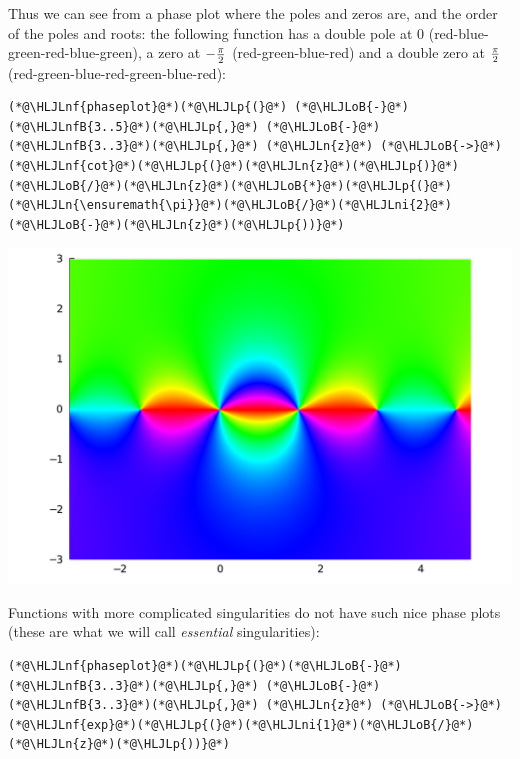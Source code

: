 \documentclass[12pt,a4paper]{article}
\newcommand{\HLJLn}[1]{#1}
\newcommand{\HLJLnf}[1]{\textcolor[RGB]{66,102,213}{#1}}
\newcommand{\HLJLnfB}[1]{\textcolor[RGB]{59,151,46}{#1}}
\newcommand{\HLJLni}[1]{\textcolor[RGB]{59,151,46}{#1}}
\newcommand{\HLJLoB}[1]{\textcolor[RGB]{102,102,102}{\textbf{#1}}}
\newcommand{\HLJLp}[1]{#1}
\begin{document}
Thus we can see from a phase plot where the poles and zeros are, and the order of the poles and roots: the following function has a double pole at 0 (red-blue-green-red-blue-green), a zero at $-{\pi \over 2}$ (red-green-blue-red) and a double zero at $\pi\over 2$ (red-green-blue-red-green-blue-red):


\begin{lstlisting}
(*@\HLJLnf{phaseplot}@*)(*@\HLJLp{(}@*) (*@\HLJLoB{-}@*)(*@\HLJLnfB{3..5}@*)(*@\HLJLp{,}@*) (*@\HLJLoB{-}@*)(*@\HLJLnfB{3..3}@*)(*@\HLJLp{,}@*) (*@\HLJLn{z}@*) (*@\HLJLoB{->}@*) (*@\HLJLnf{cot}@*)(*@\HLJLp{(}@*)(*@\HLJLn{z}@*)(*@\HLJLp{)}@*)(*@\HLJLoB{/}@*)(*@\HLJLn{z}@*)(*@\HLJLoB{*}@*)(*@\HLJLp{(}@*)(*@\HLJLn{\ensuremath{\pi}}@*)(*@\HLJLoB{/}@*)(*@\HLJLni{2}@*)(*@\HLJLoB{-}@*)(*@\HLJLn{z}@*)(*@\HLJLp{))}@*)
\end{lstlisting}

\includegraphics[width=\linewidth]{figures/Lecture1_10_1.pdf}

Functions with more complicated singularities do not have such nice phase plots (these are what we will call \emph{essential} singularities):


\begin{lstlisting}
(*@\HLJLnf{phaseplot}@*)(*@\HLJLp{(}@*)(*@\HLJLoB{-}@*)(*@\HLJLnfB{3..3}@*)(*@\HLJLp{,}@*) (*@\HLJLoB{-}@*)(*@\HLJLnfB{3..3}@*)(*@\HLJLp{,}@*) (*@\HLJLn{z}@*) (*@\HLJLoB{->}@*) (*@\HLJLnf{exp}@*)(*@\HLJLp{(}@*)(*@\HLJLni{1}@*)(*@\HLJLoB{/}@*)(*@\HLJLn{z}@*)(*@\HLJLp{))}@*)
\end{lstlisting}
\end{document}
